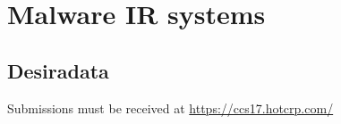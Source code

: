 \section{Malware IR systems}

\subsection{Desiradata}

Submissions must be received at \url{https://ccs17.hotcrp.com/} 